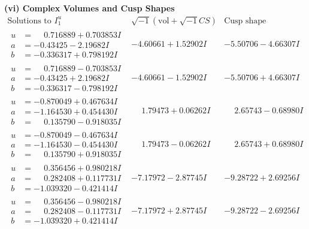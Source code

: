 \documentclass[1p]{elsarticle_modified}
\theoremstyle{definition}
\newcommand{\I}{\sqrt{-1}}
\begin{document}
\newpage\flushleft \textbf{(vi) Complex Volumes and Cusp Shapes}
$$\begin{array}{c|c|c}  
\text{Solutions to }I^u_{1}& \I (\text{vol} + \sqrt{-1}CS) & \text{Cusp shape}\\
 \hline 
\begin{aligned}
u &= \phantom{-}0.716889 + 0.703853 I \\
a &= -0.43425 - 2.19682 I \\
b &= -0.336317 + 0.798192 I\end{aligned}
 & -4.60661 + 1.52902 I & -5.50706 - 4.66307 I \\ \hline\begin{aligned}
u &= \phantom{-}0.716889 - 0.703853 I \\
a &= -0.43425 + 2.19682 I \\
b &= -0.336317 - 0.798192 I\end{aligned}
 & -4.60661 - 1.52902 I & -5.50706 + 4.66307 I \\ \hline\begin{aligned}
u &= -0.870049 + 0.467634 I \\
a &= -1.164530 + 0.454430 I \\
b &= \phantom{-}0.135790 - 0.918035 I\end{aligned}
 & \phantom{-}1.79473 + 0.06262 I & \phantom{-}2.65743 - 0.68980 I \\ \hline\begin{aligned}
u &= -0.870049 - 0.467634 I \\
a &= -1.164530 - 0.454430 I \\
b &= \phantom{-}0.135790 + 0.918035 I\end{aligned}
 & \phantom{-}1.79473 - 0.06262 I & \phantom{-}2.65743 + 0.68980 I \\ \hline\begin{aligned}
u &= \phantom{-}0.356456 + 0.980218 I \\
a &= \phantom{-}0.282408 + 0.117731 I \\
b &= -1.039320 - 0.421414 I\end{aligned}
 & -7.17972 - 2.87745 I & -9.28722 + 2.69256 I \\ \hline\begin{aligned}
u &= \phantom{-}0.356456 - 0.980218 I \\
a &= \phantom{-}0.282408 - 0.117731 I \\
b &= -1.039320 + 0.421414 I\end{aligned}
 & -7.17972 + 2.87745 I & -9.28722 - 2.69256 I \\ \hline\begin{aligned}

\end{aligned}
\end{array}$$
\end{document}
